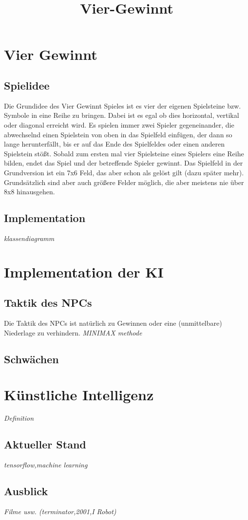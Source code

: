 \documentclass[12pt,a4paper,ngerman]{article}
\title{Vier-Gewinnt}
\author{}
\begin{document}
	\maketitle
	\newpage
	\tableofcontents
	\newpage
	
	\section{Vier Gewinnt}
	\subsection{Spielidee}
	Die Grundidee des Vier Gewinnt Spieles ist es vier der eigenen Spielsteine bzw. Symbole in eine Reihe zu bringen.
	Dabei ist es egal ob dies horizontal, vertikal oder diagonal erreicht wird.
	Es spielen immer zwei Spieler gegeneinander, die abwechselnd einen Spielstein von oben in das Spielfeld einfügen, der dann so lange herunterfällt, bis er auf das Ende des Spielfeldes oder einen anderen Spielstein stößt.
	Sobald zum ersten mal vier Spielsteine eines Spielers eine Reihe bilden, endet das Spiel und der betreffende Spieler gewinnt.
	Das Spielfeld in der Grundversion ist ein 7x6 Feld, das aber schon als gelöst gilt (dazu später mehr).
	Grundsätzlich sind aber auch größere Felder möglich, die aber meistens nie über 8x8 hinausgehen.
	\subsection{Implementation}
	\textit{klassendiagramm}
	\section{Implementation der KI}
	\subsection{Taktik des NPCs}
	Die Taktik des NPCs ist natürlich zu Gewinnen oder eine (unmittelbare) Niederlage zu verhindern.
	\textit{MINIMAX methode}
	\subsection{Schwächen}
	\section{Künstliche Intelligenz}
	\textit{Definition}
	\subsection{Aktueller Stand}
	\textit{tensorflow,machine learning}
	\subsection{Ausblick}
	\textit{Filme usw. (terminator,2001,I Robot)}
	
\end{document}
